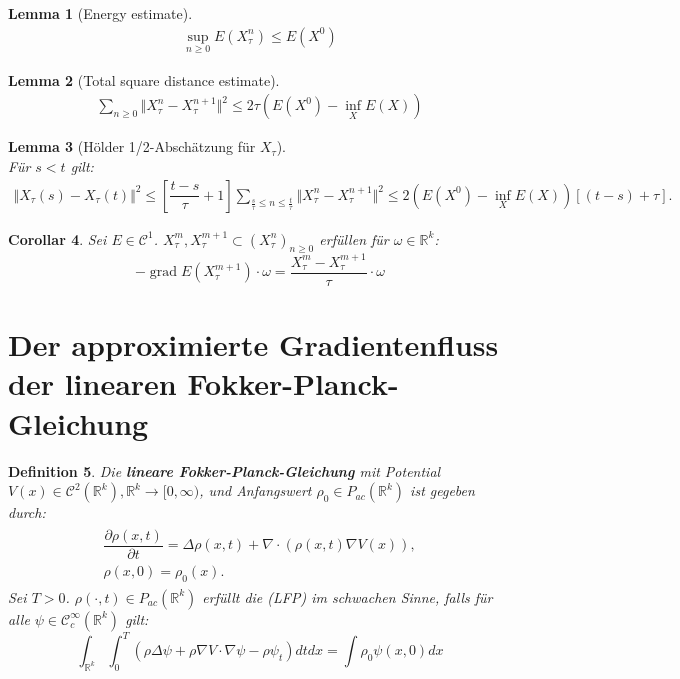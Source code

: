\documentclass[11pt,a4paper,notitlepage]{scrreprt}
\newcommand{\RR}{\mathbb{R}}
\newcommand{\grad}{\operatorname{grad}}
\newtheorem{defi}{Definition}[section]
\newtheorem{cor}[defi]{Corollar}
\newtheorem{lem}[defi]{Lemma}
\begin{document}
\begin{lem}[Energy estimate]
\begin{eqnarray*}
\sup_{n\geq 0}E(X_\tau^n)\leq E(X^0) \label{enest}
\end{eqnarray*}
\end{lem}


\begin{lem}[Total square distance estimate]
\begin{eqnarray*}
\sum_{n\geq 0}\Vert X_\tau^n-X_\tau^{n+1}\Vert^2\leq 2\tau (E(X^0)-\inf_X E(X))\label{totalsquare}
\end{eqnarray*}
\end{lem}


\begin{lem}[Hölder 1/2-Abschätzung für $X_\tau$]  $~~$ \\
Für $s<t$ gilt:
\begin{eqnarray*}
\Vert X_\tau(s)-X_\tau(t)\Vert^2 \leq \left[\dfrac{t-s}{\tau}+1\right] \sum_{\frac{s}{\tau}\leq n \leq \frac{t}{\tau}} \Vert X^n_\tau- X_\tau^{n+1}\Vert^2 \leq 2(E(X^0)-\inf_X E(X))[(t-s)+\tau]. \label{Hölder}
\end{eqnarray*}
\end{lem}

\begin{cor}
Sei $E\in \mathcal{C}^1$. $X_\tau^m,X_\tau^{m+1}\subset(X_\tau^n)_{n\geq 0}$ erfüllen für $\omega\in\RR^k$: \\
\begin{equation}
-\grad E(X_\tau^{m+1})\cdot\omega= \dfrac{ X_\tau^m-X_\tau^{m+1}}{\tau}\cdot\omega
\end{equation}
\end{cor}

 

\newpage
\section{Der approximierte Gradientenfluss der linearen Fokker-Planck-Gleichung}

\begin{defi}
Die \textbf{lineare Fokker-Planck-Gleichung}  mit Potential \\${V(x)\in \mathcal{C}^2(\RR^k), \RR^k\to[0,\infty)}$, und Anfangswert $\rho_0\in P_{ac}(\RR^k)$ ist gegeben durch:
\begin{eqnarray}
\begin{split}
\dfrac{\partial\rho(x,t)}{\partial t}=\Delta\rho(x,t)+\nabla\cdot(\rho(x,t)\nabla V(x)),\\
\rho(x,0)=\rho_0(x).\label{FP}
\end{split}
\end{eqnarray}
Sei $T>0$. $\rho(\cdot,t)\in P_{ac}(\RR^k)$ erfüllt die (LFP) im schwachen Sinne, falls für alle $\psi\in \mathcal{C}_c^\infty(\RR^k)$ gilt:
\begin{equation*}
\int_{\RR^k} \int_0^T (\rho\Delta\psi+\rho\nabla V\cdot\nabla\psi -\rho\psi_t) dt dx=\int\rho_0\psi(x,0)dx \label{FPweak}
\end{equation*}
\end{defi}
\vspace{10pt}
\end{document}
